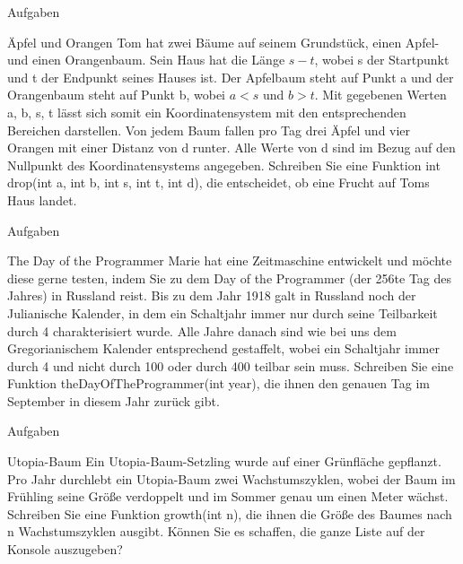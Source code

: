 \documentclass[usenames,dvipsnames,10pt]{beamer}
\begin{document}
    \begin{frame}{Aufgaben}
        \begin{block}{Äpfel und Orangen}
          Tom hat zwei Bäume auf seinem Grundstück, einen Apfel- und einen Orangenbaum. Sein Haus hat die Länge $s-t$, wobei s der Startpunkt und t der Endpunkt seines Hauses ist. Der Apfelbaum steht auf Punkt a und der Orangenbaum steht auf Punkt b, wobei $a<s$ und $b>t$. Mit gegebenen Werten a, b, s, t lässt sich somit ein Koordinatensystem mit den entsprechenden Bereichen darstellen. Von jedem Baum fallen pro Tag drei Äpfel und vier Orangen mit einer Distanz von d runter. Alle Werte von d sind im Bezug auf den Nullpunkt des Koordinatensystems angegeben. Schreiben Sie eine Funktion int drop(int a, int b, int s, int t, int d), die entscheidet, ob eine Frucht auf Toms Haus landet.
        \end{block}
    \end{frame}

    \begin{frame}{Aufgaben}
        \begin{block}{The Day of the Programmer}
          Marie hat eine Zeitmaschine entwickelt und möchte diese gerne testen, indem Sie zu dem Day of the Programmer (der 256te Tag des Jahres) in Russland reist. Bis zu dem Jahr 1918 galt in Russland noch der Julianische Kalender, in dem ein Schaltjahr immer nur durch seine Teilbarkeit durch 4 charakterisiert wurde. Alle Jahre danach sind wie bei uns dem Gregorianischem Kalender entsprechend gestaffelt, wobei ein Schaltjahr immer durch 4 und nicht durch 100 oder durch 400 teilbar sein muss. Schreiben Sie eine Funktion theDayOfTheProgrammer(int year), die ihnen den genauen Tag im September in diesem Jahr zurück gibt.
        \end{block}
    \end{frame}
    \begin{frame}{Aufgaben}
        \begin{block}{Utopia-Baum}
          Ein Utopia-Baum-Setzling wurde auf einer Grünfläche gepflanzt. Pro Jahr durchlebt ein Utopia-Baum zwei Wachstumszyklen, wobei der Baum im Frühling seine Größe verdoppelt und im Sommer genau um einen Meter wächst. Schreiben Sie eine Funktion growth(int n), die ihnen die Größe des Baumes nach n Wachstumszyklen ausgibt. Können Sie es schaffen, die ganze Liste auf der Konsole auszugeben?
        \end{block}
    \end{frame}
\end{document}
